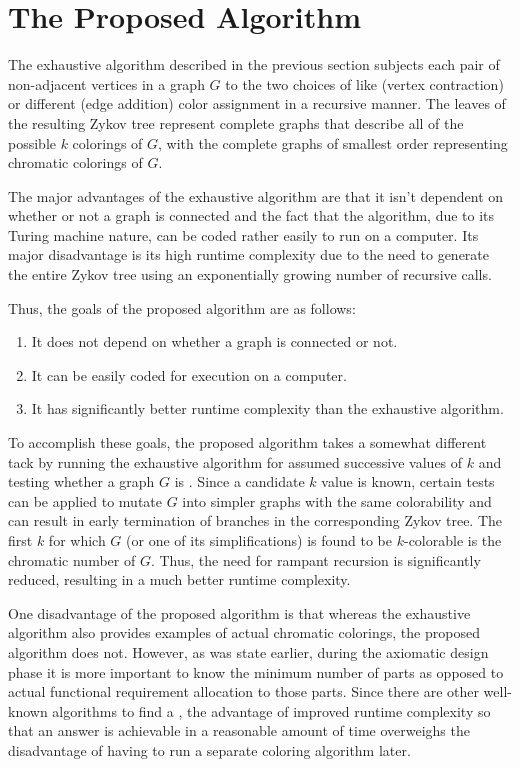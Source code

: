 \section{The Proposed Algorithm}

The exhaustive algorithm described in the previous section subjects each pair of non-adjacent vertices in a graph
\(G\) to the two choices of like (vertex contraction) or different (edge addition) color assignment in a recursive
manner.  The leaves of the resulting Zykov tree represent complete graphs that describe all of the possible \(k\)
colorings of \(G\), with the complete graphs of smallest order representing chromatic colorings of \(G\).

The major advantages of the exhaustive algorithm are that it isn't dependent on whether or not a graph is connected
and the fact that the algorithm, due to its Turing machine nature, can be coded rather easily to run on a computer.
Its major disadvantage is its high runtime complexity due to the need to generate the entire Zykov tree using an
exponentially growing number of recursive calls.

Thus, the goals of the proposed algorithm are as follows:
\begin{enumerate}
\item It does not depend on whether a graph is connected or not.
\item It can be easily coded for execution on a computer.
\item It has significantly better runtime complexity than the exhaustive algorithm.
\end{enumerate}

To accomplish these goals, the proposed algorithm takes a somewhat different tack by running the exhaustive
algorithm for assumed successive values of \(k\) and testing whether a graph \(G\) is .  Since a
candidate \(k\) value is known, certain tests can be applied to mutate \(G\) into simpler graphs with the same
colorability and can result in early termination of branches in the corresponding Zykov tree.  The first \(k\) for
which \(G\) (or one of its simplifications) is found to be \(k\)-colorable is the chromatic number of \(G\).  Thus,
the need for rampant recursion is significantly reduced, resulting in a much better runtime complexity.

One disadvantage of the proposed algorithm is that whereas the exhaustive algorithm also provides examples of actual
chromatic colorings, the proposed algorithm does not.  However, as was state earlier, during the axiomatic design
phase it is more important to know the minimum number of parts as opposed to actual functional requirement allocation
to those parts.  Since there are other well-known algorithms to find a , the advantage of improved
runtime complexity so that an answer is achievable in a reasonable amount of time overweighs the disadvantage of
having to run a separate coloring algorithm later.

